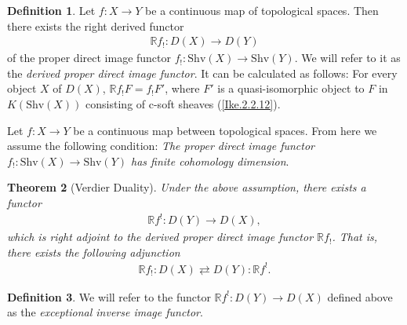 \documentclass[a4paper,dvipdfmx,11pt,reqno]{amsart}
\DeclareMathOperator{\Hom}{Hom}
\newcommand{\bbR}{\mathbb{R}}
\newcommand{\Shv}{\mathrm{Shv}}
\newtheorem{theorem}{Theorem}[section]
\theoremstyle{definition}
\newtheorem{definition}[theorem]{Definition}
\begin{document}
\begin{definition}
  Let $f : X \to Y$ be a continuous map of topological spaces.
  Then there exists the right derived functor 
  \begin{align*}
    \bbR f_{!} : D(X) \to D(Y)
  \end{align*}
  of the proper direct image functor $f_{!} : \Shv(X) \to \Shv(Y)$.
  We will refer to it as the \textit{derived proper direct image functor}.
  It can be calculated as follows:
  For every object $X$ of $D(X)$, $\bbR f_{!}F = f_{!}F'$, where $F'$ is a quasi-isomorphic object to $F$ in $K(\Shv(X))$ consisting of c-soft sheaves (\cref{Ike.2.2.12}).
\end{definition}

Let $f : X \to Y$ be a continuous map between topological spaces.
From here we assume the following condition:
\textit{The proper direct image functor $f_{!} : \Shv(X) \to \Shv(Y)$ has finite cohomology dimension}.

\begin{theorem}[Verdier Duality]
  Under the above assumption, there exists a functor
  \begin{align*}
    \bbR f^{!} : D(Y) \to D(X),
  \end{align*}
  which is right adjoint to the derived proper direct image functor $\bbR f_{!}$. 
  That is, there exists the following adjunction
  \begin{align*}
    \bbR f_{!} : D(X) \rightleftarrows D(Y) : \bbR f^{!}. 
  \end{align*}
\end{theorem}

\begin{definition}
  We will refer to the functor $\bbR f^{!} : D(Y) \to D(X)$ defined above as the \textit{exceptional inverse image functor}.
\end{definition}


  
\end{document}
